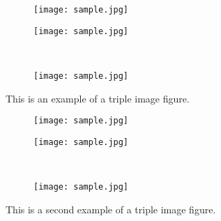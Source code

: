   \begin{figure}[!htb]
    \centering
    \hspace*{\fill}%
    \begin{subfigure}{0.45\textwidth}
      \texttt{[image: sample.jpg]}
      \caption{} %
      \label{fig3:tripleImage:a}
    \end{subfigure}
    \hspace*{\fill} %
    \par\vspace{1em}%
    \begin{subfigure}{0.45\textwidth}
      \texttt{[image: sample.jpg]}
      \caption{} %
      \label{fig3:tripleImage:b}
    \end{subfigure}
    ~ %
    \begin{subfigure}{0.45\textwidth}
      \texttt{[image: sample.jpg]}
      \caption{} %
      \label{fig3:tripleImage:c}
    \end{subfigure}
    \caption{This is an example of a triple image figure.}
    \label{fig3:tripleImage}
  \end{figure}
  
  \begin{figure}[!htb]
    \centering
    \hspace*{\fill}%
    \begin{subfigure}{0.90\textwidth+1em} %
      \texttt{[image: sample.jpg]}
      \caption{} %
      \label{fig4:tripleImage:a}
    \end{subfigure}
    \hspace*{\fill} %
    \par\vspace{1em}%
    \begin{subfigure}{0.45\textwidth}
      \texttt{[image: sample.jpg]}
      \caption{} %
      \label{fig4:tripleImage:b}
    \end{subfigure}
    ~ %
    \begin{subfigure}{0.45\textwidth}
      \texttt{[image: sample.jpg]}
      \caption{} %
      \label{fig4:tripleImage:c}
    \end{subfigure}
    \caption{This is a second example of a triple image figure.}
    \label{fig4:tripleImage}
  \end{figure}
  
